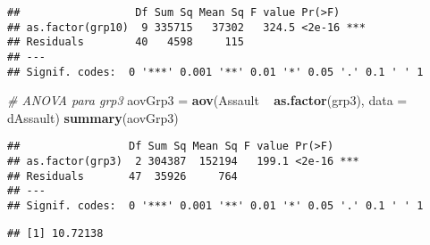 \documentclass[]{book}
\newenvironment{Shaded}{\begin{snugshade}}{\end{snugshade}}
\newcommand{\KeywordTok}[1]{\textcolor[rgb]{0.13,0.29,0.53}{\textbf{{#1}}}}
\newcommand{\DataTypeTok}[1]{\textcolor[rgb]{0.13,0.29,0.53}{{#1}}}
\newcommand{\DecValTok}[1]{\textcolor[rgb]{0.00,0.00,0.81}{{#1}}}
\newcommand{\StringTok}[1]{\textcolor[rgb]{0.31,0.60,0.02}{{#1}}}
\newcommand{\CommentTok}[1]{\textcolor[rgb]{0.56,0.35,0.01}{\textit{{#1}}}}
\newcommand{\NormalTok}[1]{{#1}}
\begin{document}
\begin{verbatim}
##                  Df Sum Sq Mean Sq F value Pr(>F)    
## as.factor(grp10)  9 335715   37302   324.5 <2e-16 ***
## Residuals        40   4598     115                   
## ---
## Signif. codes:  0 '***' 0.001 '**' 0.01 '*' 0.05 '.' 0.1 ' ' 1
\end{verbatim}

\begin{Shaded}
\begin{Highlighting}[]
\CommentTok{# ANOVA para grp3}
\NormalTok{aovGrp3 =}\StringTok{ }\KeywordTok{aov}\NormalTok{(Assault ~}\StringTok{ }\KeywordTok{as.factor}\NormalTok{(grp3), }\DataTypeTok{data =} \NormalTok{dAssault)}
\KeywordTok{summary}\NormalTok{(aovGrp3)}
\end{Highlighting}
\end{Shaded}

\begin{verbatim}
##                 Df Sum Sq Mean Sq F value Pr(>F)    
## as.factor(grp3)  2 304387  152194   199.1 <2e-16 ***
## Residuals       47  35926     764                   
## ---
## Signif. codes:  0 '***' 0.001 '**' 0.01 '*' 0.05 '.' 0.1 ' ' 1
\end{verbatim}

\begin{Shaded}
\end{Shaded}

\begin{verbatim}
## [1] 10.72138
\end{verbatim}

\begin{Shaded}
\end{Shaded}
\end{document}

